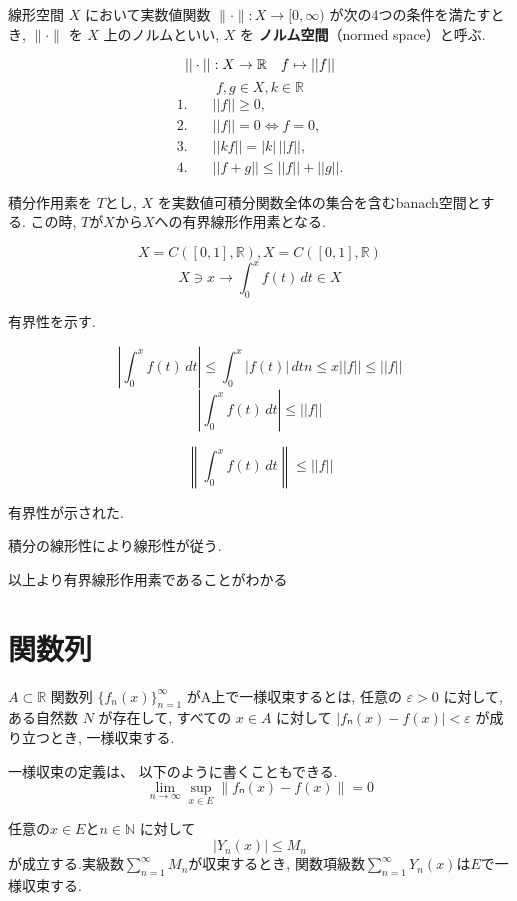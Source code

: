 \documentclass[12pt,xelatex,ja=standard]{bxjsarticle}
\begin{document}
\begin{Definition}[ノルム空間]

線形空間 $X$ において実数値関数 $\|\cdot\|: X \to [0, \infty)$ が次の4つの条件を満たすとき, $\|\cdot\|$ を $X$ 上のノルムといい, $X$ を \textbf{ノルム空間}（normed space）と呼ぶ.

    \[
    ||\cdot|| : X \to \mathbb{R}\\ \quad f \mapsto ||f|| 
    \]
    \[f,g \in X,k \in \mathbb{R}\]
    \begin{align}
    1. \quad & ||f|| \geq 0, \\
    2. \quad & ||f|| = 0 \Leftrightarrow f = 0, \\
    3. \quad & ||kf|| = |k| \, ||f||, \\
    4. \quad & ||f+g|| \leq ||f|| + ||g||.
    \end{align}

\end{Definition}
\begin{Theorem}
    積分作用素を $T$とし, $X$ を実数値可積分関数全体の集合を含むbanach空間とする.
この時, $T$が$X$から$X$への有界線形作用素となる.
\end{Theorem}
\[X=C([0,1],\mathbb{R}),X=C([0,1],\mathbb{R})\]
\[X \ni x \to \int_0^x f(t) \, dt \in X \]

有界性を示す.

\[\displaystyle \left|\int_0^x f(t) \, dt \right| \leq \displaystyle \int_0^x |f(t)| \, dtn \leq x||f|| \leq ||f||\]
\[\displaystyle \left|\int_0^x f(t) \, dt \right| \leq  ||f|| \]

\[\displaystyle 
\left\| \int_0^x f(t) \, dt \right\|  \leq ||f||
\]
 

有界性が示された.

積分の線形性により線形性が従う.

以上より有界線形作用素であることがわかる

\section{関数列}
\label{sec:関数列}
\begin{Definition}[一様収束の定義]
$A \subset \mathbb{R}$
関数列 \(\{f_n(x)\}_{n=1}^\infty\) がA上で一様収束するとは, 任意の \(\varepsilon > 0\) に対して, ある自然数 \(N\) が存在して, すべての \(x \in A\) に対して
$|fₙ(x) - f(x)| < \varepsilon$ が成り立つとき, 一様収束する.

一様収束の定義は、 以下のように書くこともできる.
\[
\lim_{n \to \infty} \sup_{x \in E} \|fₙ(x) - f(x)\| = 0
\]
\end{Definition}
\begin{Theorem}[ワイエルシュトラスのM判定法]
任意の$x \in E$と$n \in \mathbb{N}$ に対して
\[\left|Y_{n}(x)\right| \leq M_{n}\]
が成立する.実級数$\displaystyle\sum_{n=1}^\infty M_{n} $が収束するとき, 関数項級数$\displaystyle\sum_{n=1}^\infty Y_{n}(x)$は$E$で一様収束する.
\end{Theorem}
\end{document}
